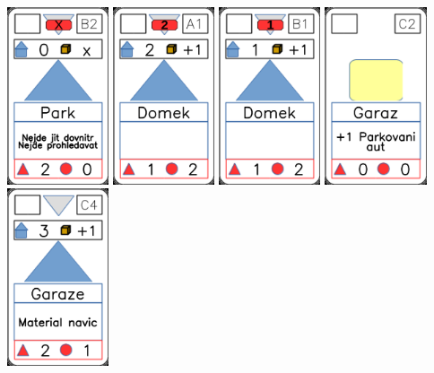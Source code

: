 \documentclass[a4paper]{article}
\begin{document}
	\includegraphics[width=3.0cm]{img-3_21}
	\includegraphics[width=3.0cm]{img-3_0}
	\includegraphics[width=3.0cm]{img-3_5}
	\includegraphics[width=3.0cm]{img-2_11}
	\includegraphics[width=3.0cm]{img-3_13}
\end{document}
